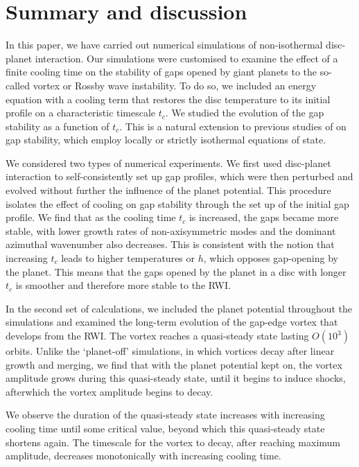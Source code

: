 \section{Summary and discussion}\label{summary}
In this paper, we have carried out numerical simulations of
non-isothermal disc-planet interaction.  
Our simulations were customised to examine the effect of a finite 
cooling time on the stability of gaps  
opened by giant planets to the so-called vortex or Rossby wave
instability. To do so, we  
included an energy equation with a cooling term that restores the 
disc temperature to its initial profile on a characteristic timescale
$t_c$. We studied the evolution of the gap stability as a function of 
$t_c$. This is a natural extension to previous studies of on gap
stability, which employ locally or strictly isothermal equations of
state.   	

We considered two types of numerical experiments. We first used
disc-planet interaction to self-consistently set up gap profiles,
which were then perturbed and evolved without further the influence of
the planet potential. This procedure isolates the effect of cooling on
gap stability through the set up of the initial gap profile. We find
that as the cooling time $t_c$ is increased, the gaps became more
stable, with lower growth rates of non-axisymmetric modes and the
dominant azimuthal wavenumber also decreases. This is consistent with
the notion that increasing $t_c$ leads to higher temperatures or $h$,
which opposes gap-opening by the planet. This means that the gaps
opened by the planet in a disc with longer $t_c$ is smoother and
therefore  more stable to the RWI.   


In the second set of calculations, we included the planet potential
throughout the simulations  and examined the long-term evolution of
the gap-edge vortex that develops from the RWI. The vortex reaches 
a quasi-steady state lasting $O(10^3)$ orbits. Unlike the `planet-off'
simulations, in which vortices decay after linear growth and merging,
we find that with the planet potential kept on, the vortex amplitude
grows during this quasi-steady state, until it begins to induce
shocks, afterwhich the vortex amplitude begins to decay.   

We observe the duration of the quasi-steady state increases with
increasing cooling time until some critical value, beyond which this
quasi-steady state shortens again. The timescale for the vortex to
decay, after reaching maximum amplitude, decreases monotonically with
increasing cooling time. 

